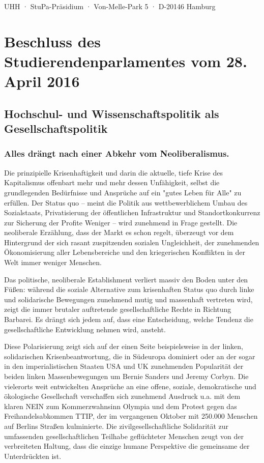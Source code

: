 \documentclass[ngerman,headheight=70pt]{scrartcl}
\begin{document}
    UHH · StuPa-Präsidium · Von-Melle-Park 5 · D-20146 Hamburg

    \section*{Beschluss des Studierendenparlamentes vom 28. April 2016}
    \subsection*{Hochschul- und Wissenschaftspolitik als Gesellschaftspolitik}

	\subsubsection{Alles drängt nach einer Abkehr vom Neoliberalismus.}

    Die prinzipielle Krisenhaftigkeit und darin die aktuelle, tiefe Krise des
    Kapitalismus offenbart mehr und mehr dessen Unfähigkeit, selbst die
    grundlegenden Bedürfnisse und Ansprüche auf ein "gutes Leben für Alle" zu
    erfüllen. Der Status quo -- meint die Politik aus wettbewerblichem Umbau des
    Sozialstaats, Privatisierung der öffentlichen Infrastruktur und
    Standortkonkurrenz zur Sicherung der Profite Weniger -- wird zunehmend in
    Frage gestellt. Die neoliberale Erzählung, dass der Markt es schon regelt,
    überzeugt vor dem Hintergrund der sich rasant zuspitzenden sozialen
    Ungleichheit, der zunehmenden Ökonomisierung aller Lebensbereiche und den
    kriegerischen Konflikten in der Welt immer weniger Menschen.

    Das politische, neoliberale Establishment verliert massiv den Boden unter
    den Füßen: während die soziale Alternative zum krisenhaften Status quo durch
    linke und solidarische Bewegungen zunehmend mutig und massenhaft vertreten
    wird, zeigt die immer brutaler auftretende gesellschaftliche Rechte in
    Richtung Barbarei. Es drängt sich jedem auf, dass eine Entscheidung, welche
    Tendenz die gesellschaftliche Entwicklung nehmen wird, ansteht.

    Diese Polarisierung zeigt sich auf der einen Seite beispielsweise in der
    linken, solidarischen Krisenbeantwortung, die in Südeuropa dominiert oder an
    der sogar in den imperialistischen Staaten USA und UK zunehmenden Popularität
    der beiden linken Massenbewegungen um Bernie Sanders und Jeremy Corbyn. Die
    vielerorts weit entwickelten Ansprüche an eine offene, soziale, demokratische
    und ökologische Gesellschaft verschaffen sich zunehmend Ausdruck u.a. mit dem
    klaren NEIN zum Kommerzwahnsinn Olympia und dem Protest gegen das
    Freihandelsabkommen TTIP, der im vergangenen Oktober mit 250.000 Menschen auf
    Berlins Straßen kulminierte. Die zivilgesellschaftliche Solidarität zur
    umfassenden gesellschaftlichen Teilhabe geflüchteter Menschen zeugt von der
    verbreiteten Haltung, dass die einzige humane Perspektive die gemeinsame der
    Unterdrückten ist.
\end{document}
